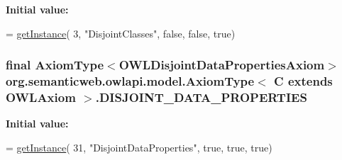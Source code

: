 {\bfseries Initial value\-:}
\begin{DoxyCode}
= \hyperlink{classorg_1_1semanticweb_1_1owlapi_1_1model_1_1_axiom_type_3_01_c_01extends_01_o_w_l_axiom_01_4_a485e011845434c518471707a87f09339}{getInstance}(
            3, \textcolor{stringliteral}{"DisjointClasses"}, \textcolor{keyword}{false}, \textcolor{keyword}{false}, \textcolor{keyword}{true})
\end{DoxyCode}
\hypertarget{classorg_1_1semanticweb_1_1owlapi_1_1model_1_1_axiom_type_3_01_c_01extends_01_o_w_l_axiom_01_4_ac9286bed361cf8c26feea1a038e222c4}{
\subsubsection[{D\-I\-S\-J\-O\-I\-N\-T\-\_\-\-D\-A\-T\-A\-\_\-\-P\-R\-O\-P\-E\-R\-T\-I\-E\-S}]{\setlength{\rightskip}{0pt plus 5cm}final {\bf Axiom\-Type}$<${\bf O\-W\-L\-Disjoint\-Data\-Properties\-Axiom}$>$ org.\-semanticweb.\-owlapi.\-model.\-Axiom\-Type$<$ C extends {\bf O\-W\-L\-Axiom} $>$.D\-I\-S\-J\-O\-I\-N\-T\-\_\-\-D\-A\-T\-A\-\_\-\-P\-R\-O\-P\-E\-R\-T\-I\-E\-S\hspace{0.3cm}{\ttfamily [static]}}}\label{classorg_1_1semanticweb_1_1owlapi_1_1model_1_1_axiom_type_3_01_c_01extends_01_o_w_l_axiom_01_4_ac9286bed361cf8c26feea1a038e222c4}
{\bfseries Initial value\-:}
\begin{DoxyCode}
= \hyperlink{classorg_1_1semanticweb_1_1owlapi_1_1model_1_1_axiom_type_3_01_c_01extends_01_o_w_l_axiom_01_4_a485e011845434c518471707a87f09339}{getInstance}(
            31, \textcolor{stringliteral}{"DisjointDataProperties"}, \textcolor{keyword}{true}, \textcolor{keyword}{true}, \textcolor{keyword}{true})
\end{DoxyCode}
